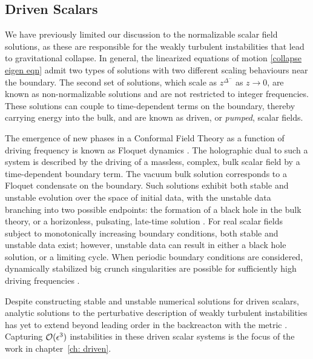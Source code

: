 \documentclass[../PhD.tex]{subfiles}
\begin{document}

\subsection{Driven Scalars}

We have previously limited our discussion to the normalizable scalar field solutions, as these are responsible for the weakly turbulent instabilities that lead to gravitational collapse. In general, the linearized equations of motion \eqref{collapse eigen eqn} admit two types of solutions with two different scaling behaviours near the boundary. The second set of solutions, which scale as $z^{\Delta^-}$ as $z \to 0$, are known as non-normalizable solutions and are not restricted to integer frequencies. These solutions can couple to time-dependent terms on the boundary, thereby carrying energy into the bulk, and are known as driven, or \emph{pumped}, scalar fields.

The emergence of new phases in a Conformal Field Theory as a function of driving frequency is known as Floquet dynamics \cite{1805.00031, 1802.05285}. The holographic dual to such a system is described by the driving of a massless, complex, bulk scalar field by a time-dependent boundary term. The vacuum bulk solution corresponds to a Floquet condensate on the boundary. Such solutions exhibit both stable and unstable evolution over the space of initial data, with the unstable data branching into two possible endpoints: the formation of a black hole in the bulk theory, or a horizonless, pulsating, late-time solution \cite{1612.07701, 1712.07637}. For real scalar fields subject to monotonically increasing boundary conditions, both stable and unstable data exist; however, unstable data can result in either a black hole solution, or a limiting cycle. When periodic boundary conditions are considered, dynamically stabilized big crunch singularities are possible for sufficiently high driving frequencies \cite{1206.2902}. 

Despite constructing stable and unstable numerical solutions for driven scalars, analytic solutions to the perturbative description of weakly turbulent instabilities has yet to extend beyond leading order in the backreacton with the metric \cite{1308.2132}. Capturing $\mathcal O(\epsilon^3)$ instabilities in these driven scalar systems is the focus of the work in chapter~\ref{ch: driven}. 


\end{document}
